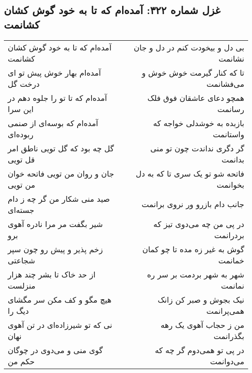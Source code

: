 \begin{center}
\section*{غزل شماره ۳۲۲: آمده‌ام که تا به خود گوش کشان کشانمت}
\label{sec:0322}
\begin{longtable}{l p{0.5cm} r}
آمده‌ام که تا به خود گوش کشان کشانمت
&&
بی دل و بیخودت کنم در دل و جان نشانمت
\\
آمده‌ام بهار خوش پیش تو ای درخت گل
&&
تا که کنار گیرمت خوش خوش و می‌فشانمت
\\
آمده‌ام که تا تو را جلوه دهم در این سرا
&&
همچو دعای عاشقان فوق فلک رسانمت
\\
آمده‌ام که بوسه‌ای از صنمی ربوده‌ای
&&
بازبده به خوشدلی خواجه که واستانمت
\\
گل چه بود که گل تویی ناطق امر قل تویی
&&
گر دگری نداندت چون تو منی بدانمت
\\
جان و روان من تویی فاتحه خوان من تویی
&&
فاتحه شو تو یک سری تا که به دل بخوانمت
\\
صید منی شکار من گر چه ز دام جسته‌ای
&&
جانب دام بازرو ور نروی برانمت
\\
شیر بگفت مر مرا نادره آهوی برو
&&
در پی من چه می‌دوی تیز که بردرانمت
\\
زخم پذیر و پیش رو چون سپر شجاعتی
&&
گوش به غیر زه مده تا چو کمان خمانمت
\\
از حد خاک تا بشر چند هزار منزلست
&&
شهر به شهر بردمت بر سر ره نمانمت
\\
هیچ مگو و کف مکن سر مگشای دیگ را
&&
نیک بجوش و صبر کن زانک همی‌پرانمت
\\
نی که تو شیرزاده‌ای در تن آهوی نهان
&&
من ز حجاب آهوی یک رهه بگذرانمت
\\
گوی منی و می‌دوی در چوگان حکم من
&&
در پی تو همی‌دوم گر چه که می‌دوانمت
\\
\end{longtable}
\end{center}

